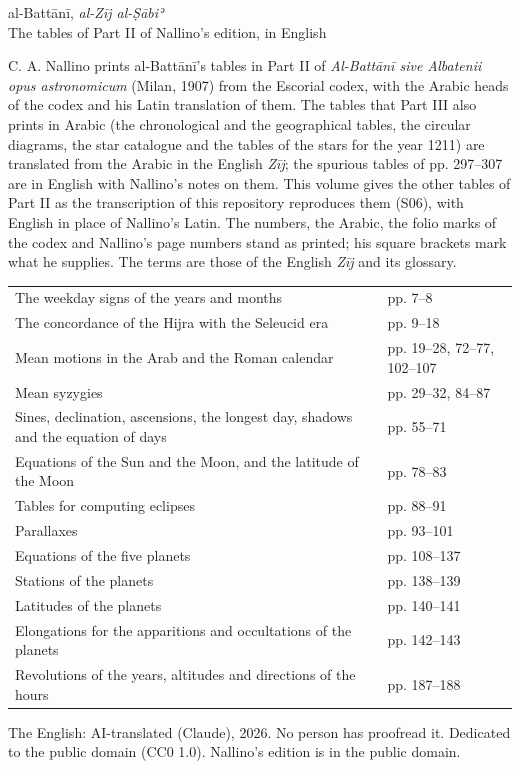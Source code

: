 \documentclass[11pt]{article}
\begin{document}
\begin{center}{\LARGE al-Battānī, \textit{al-Zīj al-Ṣābiʾ}}\\[2mm]
{\Large The tables of Part II of Nallino's edition, in English}\end{center}
\vspace{6mm}
C. A. Nallino prints al-Battānī's tables in Part II of \textit{Al-Battānī sive Albatenii opus astronomicum} (Milan,
1907) from the Escorial codex, with the Arabic heads of the codex and his Latin translation of them. The tables that
Part III also prints in Arabic (the chronological and the geographical tables, the circular diagrams, the star
catalogue and the tables of the stars for the year 1211) are translated from the Arabic in the English \textit{Zīj};
the spurious tables of pp. 297--307 are in English with Nallino's notes on them. This volume gives the other tables of
Part II as the transcription of this repository reproduces them (S06), with English in place of Nallino's Latin. The
numbers, the Arabic, the folio marks of the codex and Nallino's page numbers stand as printed; his square brackets
mark what he supplies. The terms are those of the English \textit{Zīj} and its glossary.

\vspace{4mm}
\begin{tabular}{@{}p{135mm}@{\hspace{4mm}}l@{}}
The weekday signs of the years and months & pp. 7--8 \\
The concordance of the Hijra with the Seleucid era & pp. 9--18 \\
Mean motions in the Arab and the Roman calendar & pp. 19--28, 72--77, 102--107 \\
Mean syzygies & pp. 29--32, 84--87 \\
Sines, declination, ascensions, the longest day, shadows and the equation of days & pp. 55--71 \\
Equations of the Sun and the Moon, and the latitude of the Moon & pp. 78--83 \\
Tables for computing eclipses & pp. 88--91 \\
Parallaxes & pp. 93--101 \\
Equations of the five planets & pp. 108--137 \\
Stations of the planets & pp. 138--139 \\
Latitudes of the planets & pp. 140--141 \\
Elongations for the apparitions and occultations of the planets & pp. 142--143 \\
Revolutions of the years, altitudes and directions of the hours & pp. 187--188 \\\end{tabular}

\vfill
{\small The English: AI-translated (Claude), 2026. No person has proofread it. Dedicated to the public domain
(CC0 1.0). Nallino's edition is in the public domain.}
\end{document}
